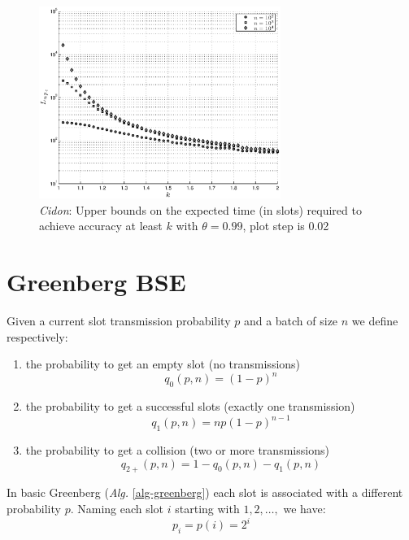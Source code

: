 \documentclass[11pt,a4paper,twoside,openright]{book}
\begin{document}
\begin{figure}[htb!]
\begin{center}
\includegraphics[width=0.7\textwidth]{matlab/Cidon/cidon-k-L-minimum}
\caption[\emph{Cidon}: Upper bounds on the expected time required for accuracy $k$]{\emph{Cidon}: Upper bounds on the expected time (in slots) required to achieve accuracy at least $k$ with $\theta=0.99$,  plot step is 0.02}
\label{cidon-k-L-minimum}
\end{center}
\end{figure}

\section{Greenberg BSE}
Given a current slot transmission probability $p$ and a batch of size $n$ we define respectively:
\begin{enumerate}
\item the probability to get an empty slot (no transmissions)
\begin{equation}q_{0}(p,n)=(1-p)^{n} \label{eq:greenberg-prob-empty}\end{equation}
\item the probability to get a successful slots (exactly one transmission)
\begin{equation}q_{1}(p,n)=n p (1-p)^{n-1} \label{eq:greenberg-prob-succ}\end{equation} 
\item the probability to get a collision (two or more transmissions)
\begin{equation}q_{2+}(p,n)=1-q_{0}(p,n)-q_{1}(p,n)\label{eq:greenberg-prob-coll}\end{equation}
\end{enumerate}

In basic Greenberg (\emph{Alg.} \ref{alg-greenberg}) each slot is associated with a different probability $p$. Naming each slot $i$ starting with $1, 2, \dots,$ we have:
\begin{equation}
	p_{i}=p(i)=2^{i}
\end{equation}
\end{document}

